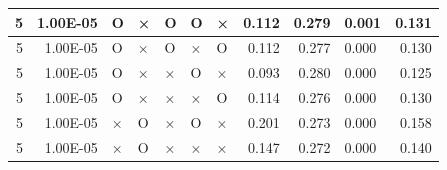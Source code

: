 \documentclass[11pt]{article}
\begin{document}
\begin{longtable}[h]{|r|r|l|l|l|l|l|r|r|l|r|}
5                                 & 1.00E-05                         & O                                & ×                                & O                                & O                                & ×                                 & 0.112                             & 0.279                             & \multicolumn{1}{r|}{0.001}         & 0.131                               \\ \hline
5                                 & 1.00E-05                         & O                                & ×                                & O                                & ×                                & O                                 & 0.112                             & 0.277                             & 0.000                              & 0.130                               \\ \hline
5                                 & 1.00E-05                         & O                                & ×                                & ×                                & O                                & ×                                 & 0.093                             & 0.280                             & 0.000                              & 0.125                               \\ \hline
5                                 & 1.00E-05                         & O                                & ×                                & ×                                & ×                                & O                                 & 0.114                             & 0.276                             & 0.000                              & 0.130                               \\ \hline
5                                 & 1.00E-05                         & ×                                & O                                & ×                                & O                                & ×                                 & 0.201                             & 0.273                             & 0.000                              & 0.158                               \\ \hline
5                                 & 1.00E-05                         & ×                                & O                                & ×                                & ×                                & ×                                 & 0.147                             & 0.272                             & 0.000                              & 0.140                               \\ \hline

\end{longtable}
\end{document}
